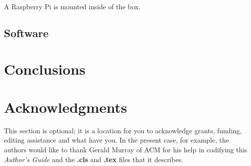\documentclass{nime-alternate}
\begin{document}
A Raspberry Pi is mounted inside of the box.
\subsection{Software}

\section{Conclusions}

\section{Acknowledgments}
This section is optional; it is a location for you
to acknowledge grants, funding, editing assistance and
what have you.  In the present case, for example, the
authors would like to thank Gerald Murray of ACM for
his help in codifying this \textit{Author's Guide}
and the \textbf{.cls} and \textbf{.tex} files that it describes.

%



\end{document}
